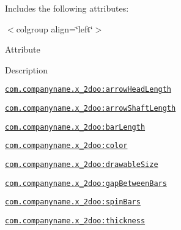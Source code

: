 Includes the following attributes: \begin{TabularC}{0}
\hline
\end{TabularC}
$<$colgroup align=\char`\"{}left\char`\"{}$>$ 

Attribute

Description 

{\tt \hyperlink{classandroid_1_1support_1_1v4_1_1_r_1_1styleable_1ae0d3d719748ee9ce810c7e3db7ab26}{com.companyname.x\_\-2doo:arrowHeadLength}}

{\tt \hyperlink{classandroid_1_1support_1_1v4_1_1_r_1_1styleable_019721c1dd6ebdd0cf7066eefbb929f5}{com.companyname.x\_\-2doo:arrowShaftLength}}

{\tt \hyperlink{classandroid_1_1support_1_1v4_1_1_r_1_1styleable_0e89f15d919cd6100bf02a0769720644}{com.companyname.x\_\-2doo:barLength}}

{\tt \hyperlink{classandroid_1_1support_1_1v4_1_1_r_1_1styleable_a1f61b1d9facd68b52706ef636cd8da9}{com.companyname.x\_\-2doo:color}}

{\tt \hyperlink{classandroid_1_1support_1_1v4_1_1_r_1_1styleable_307f755b60bc3d3a3914d600013df9db}{com.companyname.x\_\-2doo:drawableSize}}

{\tt \hyperlink{classandroid_1_1support_1_1v4_1_1_r_1_1styleable_d16bea2da35eaa358153b1dbdb3bf075}{com.companyname.x\_\-2doo:gapBetweenBars}}

{\tt \hyperlink{classandroid_1_1support_1_1v4_1_1_r_1_1styleable_eddc59e474629cd8f55d74fd27cb0b1f}{com.companyname.x\_\-2doo:spinBars}}

{\tt \hyperlink{classandroid_1_1support_1_1v4_1_1_r_1_1styleable_fb89c8d4e0500b91043fa694395850ec}{com.companyname.x\_\-2doo:thickness}}

